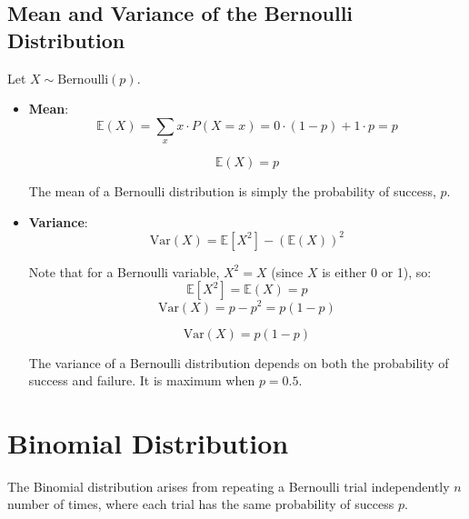 \documentclass[twoside]{book}
\begin{document}
\begin{center}
\end{center}

\subsection{Mean and Variance of the Bernoulli Distribution}

Let $X \sim \text{Bernoulli}(p)$.
\begin{itemize}
    \item \textbf{Mean}: 
\[
\mathbb{E}(X) = \sum_{x} x \cdot P(X = x) = 0 \cdot (1 - p) + 1 \cdot p = p
\]
\begin{textbox}
    \[
\mathbb{E}(X) = p
\]
\end{textbox}

The mean of a Bernoulli distribution is simply the probability of success, $p$.


\item \textbf{Variance}: 
\[
\text{Var}(X) = \mathbb{E}[X^2] - (\mathbb{E}(X))^2
\]

Note that for a Bernoulli variable, $X^2 = X$ (since $X$ is either 0 or 1), so:
\[
\mathbb{E}[X^2] = \mathbb{E}(X) = p
\]
\[
\text{Var}(X) = p - p^2 = p(1 - p)
\]
\begin{textbox}
    \[
\text{Var}(X) = p(1 - p)
\]
\end{textbox}

The variance of a Bernoulli distribution depends on both the probability of success and failure. It is maximum when $p = 0.5$.
\end{itemize}

\section{Binomial Distribution}

The {Binomial distribution} arises from repeating a Bernoulli trial independently $n$ number of times, where each trial has the same probability of success $p$.
\end{document}
